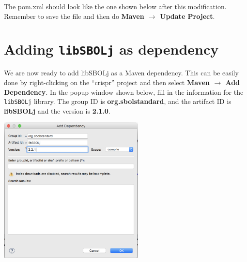 The pom.xml should look like the one shown below after this modification. Remember to save the file and then do {\bf Maven $\rightarrow$  Update Project}.

\begin{minipage}{\textwidth} 

\end{minipage}

\section*{Adding {\tt libSBOLj} as dependency}
We are now ready to add libSBOLj as a Maven dependency. This can be easily done by right-clicking on the ``crispr'' project and then select {\bf Maven $\rightarrow$ Add Dependency}.
In the popup window shown below, fill in the information for the {\tt libSBOLj} library. The group ID is {\bf org.sbolstandard}, and the artifact ID is {\bf libSBOLj} and the version is {\bf 2.1.0}. 
\begin{center}
  \includegraphics[width=0.55\textwidth]{figures/addMavenDependency2}
\end{center}

